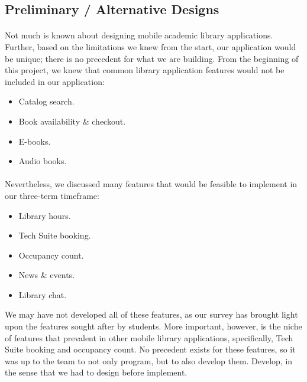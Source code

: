     
    
    \newpage
    \subsection{Preliminary / Alternative Designs}  %
    
        \paragraph{}
        Not much is known about designing mobile academic library applications. Further, based on the limitations we knew from the start, our application would be unique; there is no precedent for what we are building. From the beginning of this project, we knew that common library application features would not be included in our application:
        \begin{itemize}
            \item Catalog search.
            \item Book availability \& checkout.
            \item E-books.
            \item Audio books.
        \end{itemize}
        
        \paragraph{}
        Nevertheless, we discussed many features that would be feasible to implement in our three-term timeframe:
        \begin{itemize}
            \item Library hours.
            \item Tech Suite booking.
            \item Occupancy count.
            \item News \& events.
            \item Library chat.
        \end{itemize}
        We may have not developed all of these features, as our survey has brought light upon the features sought after by students. More important, however, is the niche of features that prevalent in other mobile library applications, specifically, Tech Suite booking and occupancy count. No precedent exists for these features, so it was up to the team to not only program, but to also develop them. Develop, in the sense that we had to design before implement.
    
